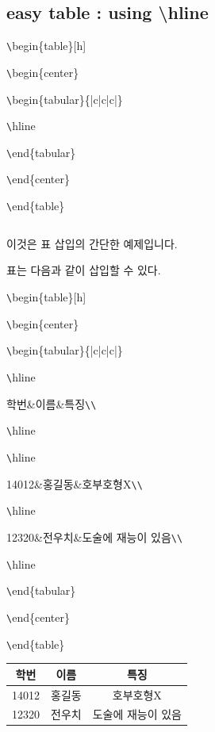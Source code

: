 \documentclass[11pt]{article}
\begin{document}
\subsection{easy table : using \textbackslash hline}

\verb+\+begin\{table\}[h]

\verb+\+begin\{center\}

\verb+\+begin\{tabular\}\{|c|c|c|\}

\verb+\+hline

\verb+\+end\{tabular\}

\verb+\+end\{center\}

\verb+\+end\{table\}


\begin{table}[h]
	\begin{center}
		\begin{tabular}{|c|c|c|}
			\hline
		\end{tabular}
	\end{center}
\end{table}

이것은 표 삽입의 간단한 예제입니다.

표는 다음과 같이 삽입할 수 있다.

\verb+\+begin\{table\}[h]

\verb+\+begin\{center\}

\verb+\+begin\{tabular\}\{|c|c|c|\}

\verb+\+hline

학번\&이름\&특징\verb+\+\verb+\+

\verb+\+hline

\verb+\+hline

14012\&홍길동\&호부호형X\verb+\+\verb+\+

\verb+\+hline

12320\&전우치\&도술에 재능이 있음\verb+\+\verb+\+

\verb+\+hline

\verb+\+end\{tabular\}

\verb+\+end\{center\}

\verb+\+end\{table\}


\begin{table}[h]
	\begin{center}
		\begin{tabular}{|c|c|c|}
			\hline
			학번&이름&특징\\
			\hline
			\hline
			14012&홍길동&호부호형X\\
			\hline
			12320&전우치&도술에 재능이 있음\\
			\hline
		\end{tabular}
	\end{center}
\end{table}
\end{document}
